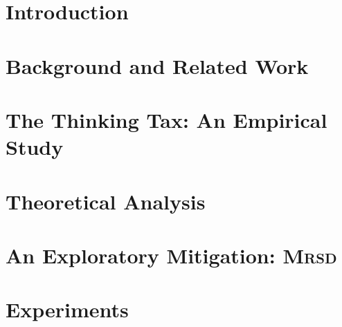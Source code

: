 \documentclass{article}
\newcommand{\method}{\textsc{Mrsd}}
\theoremstyle{remark}
\begin{document}
\section{Introduction}
\label{sec:intro}



\section{Background and Related Work}
\label{sec:related}



\section{The Thinking Tax: An Empirical Study}
\label{sec:thinking-tax}



\section{Theoretical Analysis}
\label{sec:theory}



\section{An Exploratory Mitigation: \method{}}
\label{sec:method}



\section{Experiments}
\label{sec:experiments}
\end{document}
